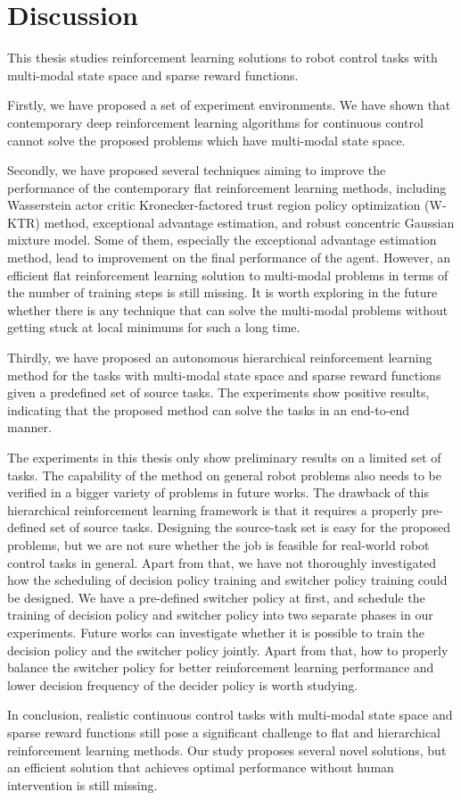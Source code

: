 \chapter{Discussion}
This thesis studies reinforcement learning solutions to robot control tasks with multi-modal state space and sparse reward functions.

Firstly, we have proposed a set of experiment environments. We have shown that contemporary deep reinforcement learning algorithms for continuous control cannot solve the proposed problems which have multi-modal state space. 

Secondly, we have proposed several techniques aiming to improve the performance of the contemporary flat reinforcement learning methods, including Wasserstein actor critic Kronecker-factored trust region policy optimization (W-KTR) method, exceptional advantage estimation, and robust concentric Gaussian mixture model. Some of them, especially the exceptional advantage estimation method, lead to improvement on the final performance of the agent. However, an efficient flat reinforcement learning solution to multi-modal problems in terms of the number of training steps is still missing. It is worth exploring in the future whether there is any technique that can solve the multi-modal problems without getting stuck at local minimums for such a long time.

Thirdly, we have proposed an autonomous hierarchical reinforcement learning method for the tasks with multi-modal state space and sparse reward functions given a predefined set of source tasks. The experiments show positive results, indicating that the proposed method can solve the tasks in an end-to-end manner.

The experiments in this thesis only show preliminary results on a limited set of tasks. The capability of the method on general robot problems also needs to be verified in a bigger variety of problems in future works. The drawback of this hierarchical reinforcement learning framework is that it requires a properly pre-defined set of source tasks. Designing the source-task set is easy for the proposed problems, but we are not sure whether the job is feasible for real-world robot control tasks in general. Apart from that, we have not thoroughly investigated how the scheduling of decision policy training and switcher policy training could be designed. We have a pre-defined switcher policy at first, and schedule the training of decision policy and switcher policy into two separate phases in our experiments. Future works can investigate whether it is possible to train the decision policy and the switcher policy jointly. Apart from that, how to properly balance the switcher policy for better reinforcement learning performance and lower decision frequency of the decider policy is worth studying.

In conclusion, realistic continuous control tasks with multi-modal state space and sparse reward functions still pose a significant challenge to flat and hierarchical reinforcement learning methods. Our study proposes several novel solutions, but an efficient solution that achieves optimal performance without human intervention is still missing.